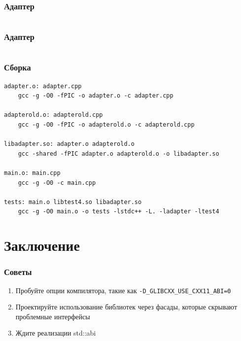 \documentclass{beamer}
\begin{document}
\begin{frame}[fragile]
\frametitle{Адаптер}
\inputminted{c++}{../src/adapterold.cpp}
\end{frame}

\begin{frame}[fragile]
\frametitle{Адаптер}
\inputminted{c++}{../src/adapter.cpp}
\end{frame}

\begin{frame}[fragile]
\frametitle{Сборка}
\begin{verbatim}
adapter.o: adapter.cpp
	gcc -g -O0 -fPIC -o adapter.o -c adapter.cpp

adapterold.o: adapterold.cpp
	gcc -g -O0 -fPIC -o adapterold.o -c adapterold.cpp

libadapter.so: adapter.o adapterold.o
	gcc -shared -fPIC adapter.o adapterold.o -o libadapter.so 

main.o: main.cpp
	gcc -g -O0 -c main.cpp 

tests: main.o libtest4.so libadapter.so
	gcc -g -O0 main.o -o tests -lstdc++ -L. -ladapter -ltest4
\end{verbatim}
\end{frame}

\section{Заключение}

\begin{frame}[fragile]
\frametitle{Советы}
\begin{enumerate}
\item Пробуйте опции компилятора, такие как
  \texttt{-D\_GLIBCXX\_USE\_CXX11\_ABI=0}
\item Проектируйте использование библиотек через фасады, которые
  скрывают проблемные интерфейсы
\item Ждите реализации std::abi
\end{enumerate}
\end{frame}
\end{document}
